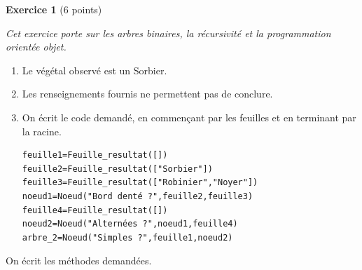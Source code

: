 \documentclass[11pt,a4paper]{article}
\begin{document}


\bigskip

\textbf{Exercice 1} (6 points)

\medskip

\textit{Cet exercice porte sur les arbres binaires, la récursivité et la programmation orientée objet.}

\begin{enumerate}
\item Le végétal observé est un Sorbier.
\item Les renseignements fournis ne permettent pas de conclure.
\item On écrit le code demandé, en commençant par les feuilles et en terminant par la racine.

\begin{verbatim}
feuille1=Feuille_resultat([])
feuille2=Feuille_resultat(["Sorbier"])
feuille3=Feuille_resultat(["Robinier","Noyer"])
noeud1=Noeud("Bord denté ?",feuille2,feuille3)
feuille4=Feuille_resultat([])
noeud2=Noeud("Alternées ?",noeud1,feuille4)
arbre_2=Noeud("Simples ?",feuille1,noeud2)
\end{verbatim}

\end{enumerate}

On écrit les méthodes demandées.
\end{document}
